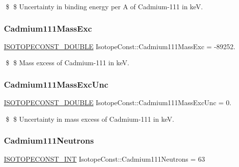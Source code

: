 \$ \$ Uncertainty in binding energy per A of Cadmium-\/111 in keV. \mbox{\label{group___isotope_const-_cadmium-_cd111_ga18dc6667f7d01b7d076aa119490204a1}} 
\subsubsection{\texorpdfstring{Cadmium111\+Mass\+Exc}{Cadmium111MassExc}}
{\footnotesize\ttfamily \mbox{\hyperlink{group___isotope_const-_macros_ga8f45a7272ce02c0b4c65c44636ed719a}{I\+S\+O\+T\+O\+P\+E\+C\+O\+N\+S\+T\+\_\+\+D\+O\+U\+B\+LE}} Isotope\+Const\+::\+Cadmium111\+Mass\+Exc = -\/89252.}

\$ \$ Mass excess of Cadmium-\/111 in keV. \mbox{\label{group___isotope_const-_cadmium-_cd111_ga72c876471b99f242cc0459f1bbd2a51b}} 
\subsubsection{\texorpdfstring{Cadmium111\+Mass\+Exc\+Unc}{Cadmium111MassExcUnc}}
{\footnotesize\ttfamily \mbox{\hyperlink{group___isotope_const-_macros_ga8f45a7272ce02c0b4c65c44636ed719a}{I\+S\+O\+T\+O\+P\+E\+C\+O\+N\+S\+T\+\_\+\+D\+O\+U\+B\+LE}} Isotope\+Const\+::\+Cadmium111\+Mass\+Exc\+Unc = 0.}

\$ \$ Uncertainty in mass excess of Cadmium-\/111 in keV. \mbox{\label{group___isotope_const-_cadmium-_cd111_ga9eaef22f7263ac3bdc4f2b95ff5a2ad2}} 
\subsubsection{\texorpdfstring{Cadmium111\+Neutrons}{Cadmium111Neutrons}}
{\footnotesize\ttfamily \mbox{\hyperlink{group___isotope_const-_macros_ga5f18360b3e99483a35c32d789e62621c}{I\+S\+O\+T\+O\+P\+E\+C\+O\+N\+S\+T\+\_\+\+I\+NT}} Isotope\+Const\+::\+Cadmium111\+Neutrons = 63}

